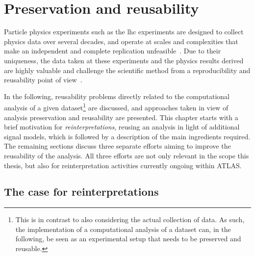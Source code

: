
\chapter{Preservation and reusability}\label{ch:preservation}

\graphicspath{{chapter-preservation/Figs/Vector/}{chapter-preservation/Figs/}}

Particle physics experiments such as the \gls{lhc} experiments are designed to collect physics data over several decades, and operate at scales and complexities that make an independent and complete replication unfeasible~\cite{open_is_not_enough}.
Due to their uniqueness, the data taken at these experiments and the physics results derived are highly valuable and challenge the scientific method from a reproducibility and reusability point of view~\cite{open_is_not_enough}.

In the following, reusability problems directly related to the computational analysis of a given dataset\footnote{This is in contrast to also considering the actual collection of data. As such, the implementation of a computational analysis of a dataset can, in the following, be seen as an experimental setup that needs to be preserved and reusable.} are discussed, and approaches taken in view of analysis preservation and reusability are presented.
This chapter starts with a brief motivation for \textit{reinterpretations}, \ie reusing an analysis in light of additional signal models, which is followed by a description of the main ingredients required.
The remaining sections discuss three separate efforts aiming to improve the reusability of the \onelepton analysis. All three efforts are not only relevant in the scope 	 this thesis, but also for reinterpretation activities currently ongoing within ATLAS.

\section{The case for reinterpretations}\label{sec:reinterpretations}

